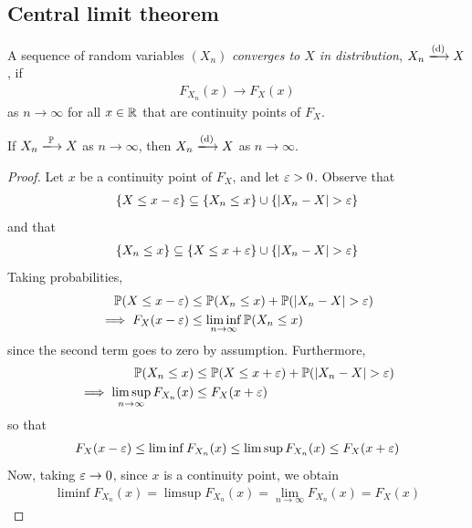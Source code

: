 \documentclass{../../template/note}
\begin{document}
    \subsection{Central limit theorem}

    \begin{definition}
        A sequence of random variables \((X_n)\) \emph{converges to \(X\) in distribution}, \(X_n \dto X\), if
        \begin{align*}
            F_{X_n}(x) \to F_X(x)
        \end{align*}
        as \(n \to \infty\) for all \(x \in \mathbb R\) that are continuity points of \(F_X\).
    \end{definition}

    
    \begin{proposition}
        If \(X_n \pto X\) as \(n \to \infty\), then \(X_n \dto X\) as \(n \to \infty\).
    \end{proposition}
    
    \begin{proof}
        Let \(x\) be a continuity point of \(F_X\), and let \(\varepsilon > 0\). Observe that
        \begin{align*}
            \{X \leq x - \varepsilon\} \subseteq \{X_n \leq x\} \cup \{|X_n-X| > \varepsilon\}
        \end{align*}
        and that
        \begin{align*}
            \{X_n \leq x\} \subseteq \{X \leq x+\varepsilon\} \cup \{|X_n-X| > \varepsilon\}
        \end{align*}
        Taking probabilities,
        \begin{align*}
            \mathbb P(X \leq x-\varepsilon) &\leq \mathbb P(X_n \leq x) + \mathbb P(|X_n-X| > \varepsilon) \\
            \implies F_X(x-\varepsilon) &\leq \liminf_{n \to \infty} \mathbb P(X_n \leq x)
        \end{align*}
        since the second term goes to zero by assumption. Furthermore,
        \begin{align*}
            \mathbb P(X_n \leq x) &\leq \mathbb P(X \leq x + \varepsilon) + \mathbb P(|X_n-X| > \varepsilon) \\
            \implies \limsup_{n \to \infty} F_{X_n}(x) &\leq F_X(x+\varepsilon)
        \end{align*}
        so that
        \begin{align*}
            F_X(x-\varepsilon) \leq \liminf F_{X_n}(x) \leq \limsup F_{X_n}(x) \leq F_X(x+\varepsilon)
        \end{align*}
        Now, taking \(\varepsilon \to 0\), since \(x\) is a continuity point, we obtain
        \begin{align*}
            \liminf F_{X_n}(x) = \limsup F_{X_n}(x) = \lim_{n \to \infty} F_{X_n}(x) = F_X(x)
        \end{align*}
    \end{proof}
\end{document}
